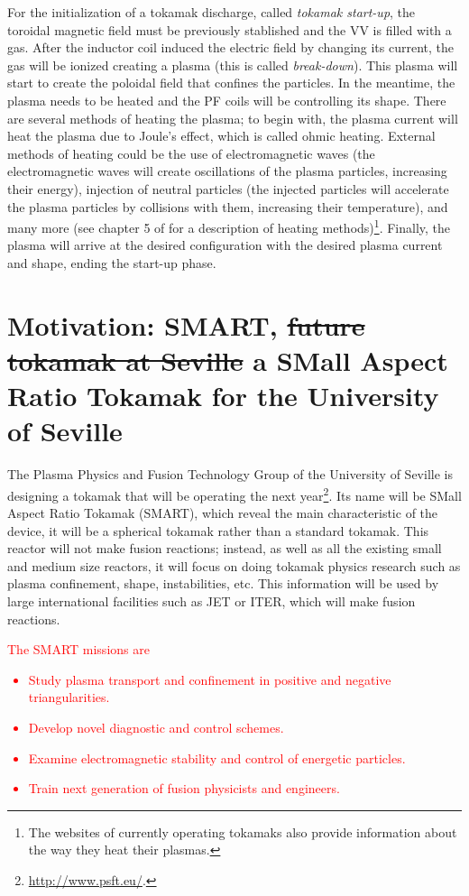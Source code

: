 \documentclass[a4paper,12pt,oneside]{book}
\begin{document}
For the initialization of a tokamak discharge, called \textit{tokamak start-up}, the toroidal magnetic field must be previously stablished and the VV is filled with a gas. After the inductor coil induced the electric field by changing its current, the gas will be ionized creating a plasma (this is called \textit{break-down}). This plasma will start to create the poloidal field that confines the particles. In the meantime, the plasma needs to be heated and the PF coils will be controlling its shape. There are several methods of heating the plasma; to begin with, the plasma current will heat the plasma due to Joule's effect, which is called ohmic heating. External methods of heating could be the use of electromagnetic waves (the electromagnetic waves will create oscillations of the plasma particles, increasing their energy), injection of neutral particles (the injected particles will accelerate the plasma particles by collisions with them, increasing their temperature), and many more (see chapter 5 of \cite{Wesson} for a description of heating methods)\footnote{The websites of currently operating tokamaks also provide information about the way they heat their plasmas.}. Finally, the plasma will arrive at the desired configuration with the desired plasma current and shape, ending the start-up phase.



\section[Motivation: SMART]{Motivation: SMART, \st{future tokamak at Seville} a SMall Aspect Ratio Tokamak for the University of Seville}
\label{sec_SMART_intro}
The Plasma Physics and Fusion Technology Group of the University of Seville is designing a tokamak that will be operating the next year\footnote{\url{http://www.psft.eu/}.}. Its name will be SMall Aspect Ratio Tokamak (SMART), which reveal the main characteristic of the device, it will be a spherical tokamak  rather than a standard tokamak. This reactor will not make fusion reactions; instead, as well as all the existing small and medium size reactors, it will focus on doing tokamak physics research such as plasma confinement, shape, instabilities, etc. This information will be used by large international facilities such as JET or ITER, which will make fusion reactions. \textcolor{red}{The SMART missions are
%
\begin{itemize}
\item Study plasma transport and confinement in positive and negative triangularities.
\item Develop novel diagnostic and control schemes.
\item Examine electromagnetic stability and control of energetic particles.
\item Train next generation of fusion physicists and engineers.
\end{itemize} }
\end{document}
